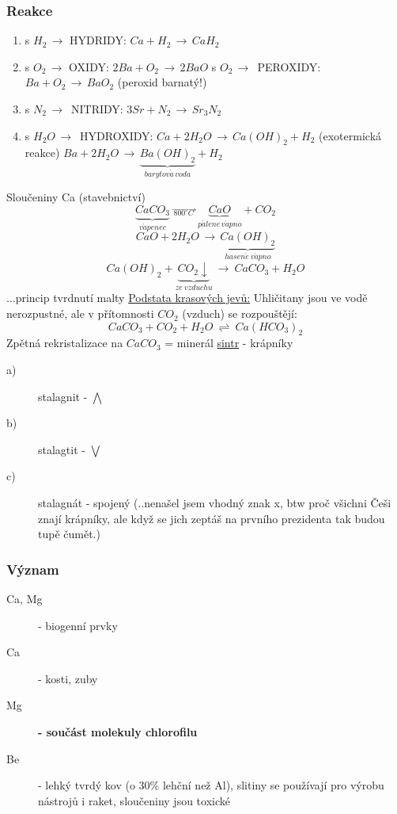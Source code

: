 \documentclass{article}
\def\WATER{H_2O}
\begin{document}
    \subsubsection{Reakce}
    \begin{enumerate}
        \item s $H_2 \,\to$ HYDRIDY: \tab $Ca + H_2 \,\to\, CaH_2$
        \item s $O_2 \,\to$ OXIDY: \tab $2Ba + O_2 \,\to\, 2BaO$
            \newline s $O_2 \,\to\,$ PEROXIDY: \tab $Ba + O_2 \,\to\, BaO_2$ (peroxid barnatý!)
        \item s $N_2 \,\to\,$ NITRIDY: \tab $3Sr + N_2 \,\to\, Sr_3 N_2$
        \item s $\WATER \,\to\,$ HYDROXIDY: \tab $Ca+2\WATER \,\to\, Ca \left( OH \right) _2 + H_2$ (exotermická reakce)
            \newline \tab\tab $Ba + 2\WATER \,\to\, \underbrace{Ba \left( OH \right) _2}_{barytov\acute{a}\,voda} + H_2$ 
    \end{enumerate}
    Sloučeniny Ca (stavebnictví)
    \[\underbrace{CaCO_3}_{v\acute{a}penec} \,\overrightarrow{\, _{800^\circ C} \,} \, \underbrace{CaO}_{p\acute{a}lene \, v\acute{a}pno} + CO_2\]
    \newline
    \[CaO + 2\WATER \,\to\, \underbrace{Ca \left(OH\right)_2}_{hasen\acute{e}~v\acute{a}pno}\]
    \newline
    \[Ca\left(OH\right)_2 + \underbrace{CO_2 \downarrow}_{ze~vzduchu} ~\to~ CaCO_3 + \WATER\] ...princip tvrdnutí malty
    \newline \newline
    \underline{Podstata krasových jevů:} Uhličitany jsou ve vodě nerozpustné, ale v přítomnosti $CO_2$ (vzduch) se rozpouštějí:
    \[CaCO_3 + CO_2 + \WATER ~\rightleftharpoons ~ Ca \left( HCO_3 \right)_2 \]
    Zpětná rekristalizace na $CaCO_3$ = minerál \underline{sintr} - krápníky
    \begin{description}
        \item[a)] stalagnit - $\bigwedge$
        \item[b)] stalagtit - $\bigvee$
        \item[c)] stalagnát - spojený \tiny{(..nenašel jsem vhodný znak x, btw proč všichni Češi znají krápníky, ale když se jich zeptáš na prvního prezidenta tak budou tupě čumět.)}
    \end{description}

    \subsubsection{Význam}
    \begin{description}
        \item[Ca, Mg] - biogenní prvky
        \item[Ca] - kosti, zuby
        \item[Mg] \textbf{- součást molekuly chlorofilu}
        \item[Be] - lehký tvrdý kov (o 30\% lehční než Al), slitiny se používají pro výrobu nástrojů i raket, sloučeniny jsou toxické
    \end{description}
\end{document}
